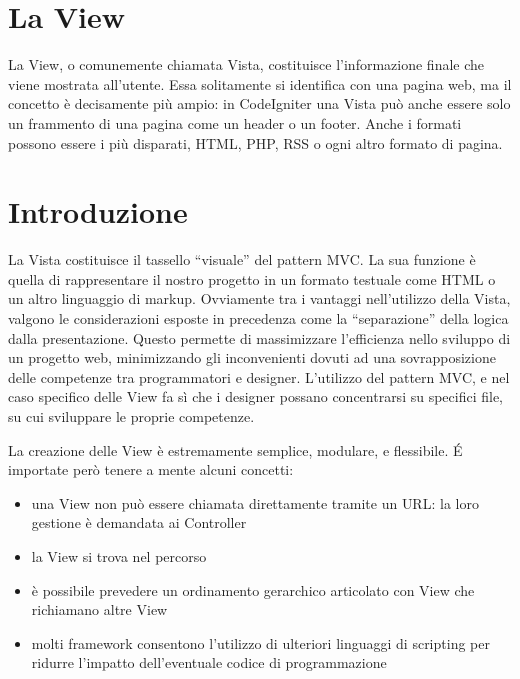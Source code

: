\section{La View}
\label{cap:view}

La View, o comunemente chiamata Vista, costituisce l'informazione finale che viene mostrata all'utente. Essa solitamente si identifica con una pagina web, ma il concetto è decisamente più ampio: in CodeIgniter una Vista può anche essere solo un frammento di una pagina come un header o un footer. Anche i formati possono essere i più disparati, \ac{HTML}, \ac{PHP}, \ac{RSS} o ogni altro formato di pagina.

\section*{Introduzione}
La Vista costituisce il tassello ``visuale'' del pattern \ac{MVC}. La sua funzione è quella di rappresentare il nostro progetto in un formato testuale come \ac{HTML} o un altro linguaggio di markup. Ovviamente tra i vantaggi nell'utilizzo della Vista, valgono le considerazioni esposte in precedenza come la ``separazione'' della logica dalla presentazione. Questo permette di massimizzare l'efficienza nello sviluppo di un progetto web, minimizzando gli inconvenienti dovuti ad una sovrapposizione delle competenze tra programmatori e designer. L'utilizzo del pattern \ac{MVC}, e nel caso specifico delle View fa sì che i designer possano concentrarsi su specifici file, su cui sviluppare le proprie competenze.

La creazione delle View è estremamente semplice, modulare, e flessibile. \'E importate però tenere a mente alcuni concetti:

\begin{itemize}
\item una View non può essere chiamata direttamente tramite un \ac{URL}: la loro gestione è demandata ai Controller
\item la View si trova nel percorso 
\item è possibile prevedere un ordinamento gerarchico articolato con View che richiamano altre View
\item molti framework consentono l'utilizzo di ulteriori linguaggi di scripting per ridurre l'impatto dell'eventuale codice di programmazione
\end{itemize}

